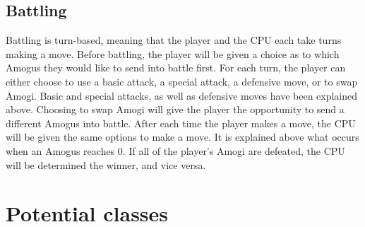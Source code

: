 \documentclass{article}
\begin{document}
  \subsection{Battling}
  Battling is turn-based, meaning that the player and the CPU each take turns making a move. Before battling, the player will be given a choice as to which Amogus they would like to send into battle first. For each turn, the player can either choose to use a basic attack, a special attack, a defensive move, or to swap Amogi. Basic and special attacks, as well as defensive moves have been explained above. Choosing to swap Amogi will give the player the opportunity to send a different Amogus into battle. After each time the player makes a move, the CPU will be given the same options to make a move. It is explained above what occurs when an Amogus reaches 0. If all of the player's Amogi are defeated, the CPU will be determined the winner, and vice versa.
  
  \pagebreak

  \section{Potential classes}
  
  \setlength{\parskip}{0em}
  
\end{document}
